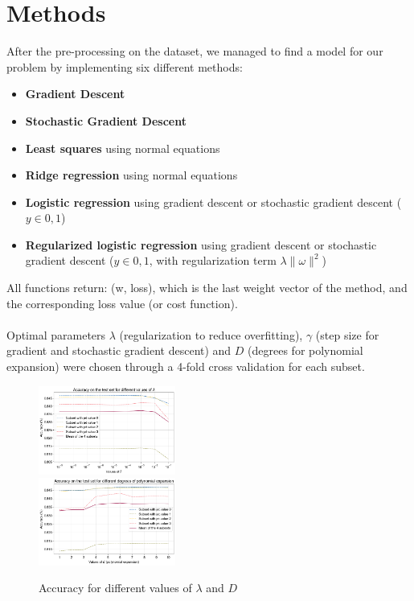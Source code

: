 \documentclass[10pt,conference,compsocconf]{IEEEtran}
\begin{document}
\section{Methods}
After the pre-processing on the dataset, we managed to find a model for our problem by implementing six different methods:
\begin{itemize}
    \item \textbf{Gradient Descent}
    \item \textbf{Stochastic Gradient Descent}
    \item \textbf{Least squares} using normal equations
    \item \textbf{Ridge regression} using normal equations
    \item \textbf{Logistic regression} using gradient descent or stochastic gradient descent ($y \in {0,1}$)
    \item \textbf{Regularized logistic regression} using gradient descent or stochastic gradient descent ($y \in {0,1}$, with regularization term $ \lambda  \| \omega \|^2$)
\end{itemize}
All functions return: (w, loss), which is the last weight vector of the
method, and the corresponding loss value (or cost function).\\
\vspace{0.05cm}\\
Optimal parameters $\lambda$ (regularization to reduce overfitting), $\gamma$ (step size for gradient and stochastic gradient descent) and $D$ (degrees for polynomial expansion) were chosen through a 4-fold cross validation for each subset.
\begin{figure}[h]
    \centering
    \includegraphics[width=0.4\textwidth]{report/lambdas2.png} \\
    \includegraphics[width=0.4\textwidth]{report/degrees2.png}
    \caption{Accuracy for different values of $\lambda$ and $D$}
    \label{fig:lambdas}
\end{figure}\\
\end{document}
